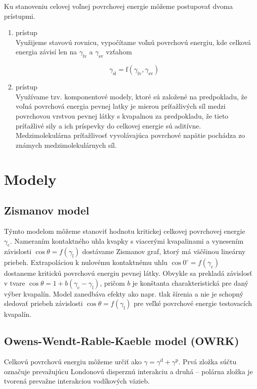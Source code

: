 \documentclass[12pt]{article}
\begin{document}
Ku stanoveniu celovej voľnej povrchovej energie môžeme postupovať dvoma prístupmi.

\begin{enumerate}
\item prístup\\
Využijeme stavovú rovnicu, vypočítame voľnú povrchovú energiu, kde celková energia závisí len na $\gamma_\mathrm{lv}$ a $\gamma_\mathrm{sv}$ vzťahom

\begin{equation}
\gamma_\mathrm{sl} = \mathrm{f}(\gamma_\mathrm{lv} , \gamma_\mathrm{sv}  )
\end{equation}

\item prístup\\
Využívame tzv. komponentové modely, ktoré sú založené na predpokladu, že voľná povrchová energia pevnej latky je mierou príťažlivých síl medzi povrchovou vrstvou pevnej látky s kvapalnou za predpokladu, že tieto príťažlivé sily a ich príspevky do celkovej energie sú aditívne. Medzimolekulárna príťažlivosť vyvolávajúca povrchové napätie pochádza zo známych medzimolekulárnych síl. 
\end{enumerate}



\section{Modely}
\subsection{Zismanov model}
Týmto modelom môžeme stanoviť hodnotu kritickej celkovej povrchovej energie $\gamma_\mathrm{c}$. Nameraním kontaktného uhla kvapky s viacerými kvapalinami a vynesením závislosti $\cos \theta = f (\gamma_\mathrm{l})$ dostávame Zismanov graf, ktorý má väčšinou lineárny priebeh. Extrapoláciou k nulovému kontaktnému uhlu $\cos 0^\circ = f (\gamma_\mathrm{c})$ dostaneme kritickú povrchovú energiu pevnej látky. Obvykle sa prekladá závislosť v tvare $\cos \theta = 1 + b (\gamma_\mathrm{c} - \gamma_\mathrm{l})$, pričom $b$ je konštanta charakteristická pre daný výber kvapalín. Model zanedbáva efekty ako napr. tlak šírenia a nie je schopný sledovať priebeh závislosti $\cos \theta = f (\gamma_\mathrm{l})$ pre veľké povrchové energie testovacích kvapalín. 

\subsection{Owens-Wendt-Rable-Kaeble model (OWRK)}
Celkovú povrchovú energiu môžeme určiť ako $\gamma = \gamma^\mathrm{d} + \gamma^\mathrm{p}$. Prvá zložka súčtu označuje prevažujúcu Londonovú disperznú interakciu a druhá – polárna zložka je tvorená prevažne interakciou vodíkových väzieb.
\end{document}
